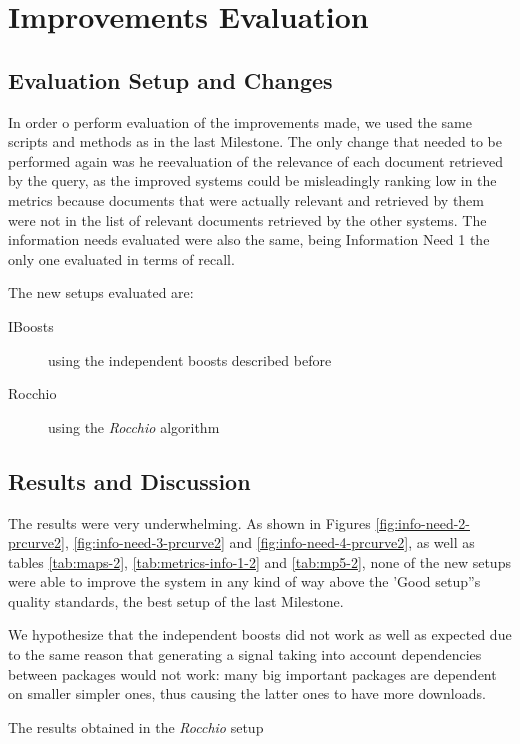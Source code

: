 \section{Improvements Evaluation}

\subsection{Evaluation Setup and Changes}

In order o perform evaluation of the improvements made, we used the same scripts and methods as in the last Milestone. The only change that needed to be performed again was he reevaluation of the relevance of each document retrieved by the query, as the improved systems could be misleadingly ranking low in the metrics because documents that were actually relevant and retrieved by them were not in the list of relevant documents retrieved by the other systems. The information needs evaluated were also the same, being Information Need 1 the only one evaluated in terms of recall.

The new setups evaluated are:

\begin{description}
    \item[IBoosts] using the independent boosts described before
    \item[Rocchio] using the \emph{Rocchio} algorithm
\end{description}

\subsection{Results and Discussion}

The results were very underwhelming. As shown in Figures \ref{fig:info-need-2-prcurve2}, \ref{fig:info-need-3-prcurve2} and \ref{fig:info-need-4-prcurve2}, as well as tables \ref{tab:maps-2}, \ref{tab:metrics-info-1-2} and \ref{tab:mp5-2}, none of the new setups were able to improve the system in any kind of way above the 'Good setup''s quality standards, the best setup of the last Milestone. 

We hypothesize that the independent boosts did not work as well as expected due to the same reason that generating a signal taking into account dependencies between packages would not work: many big important packages are dependent on smaller simpler ones, thus causing the latter ones to have more downloads.

The results obtained in the \emph{Rocchio} setup %

